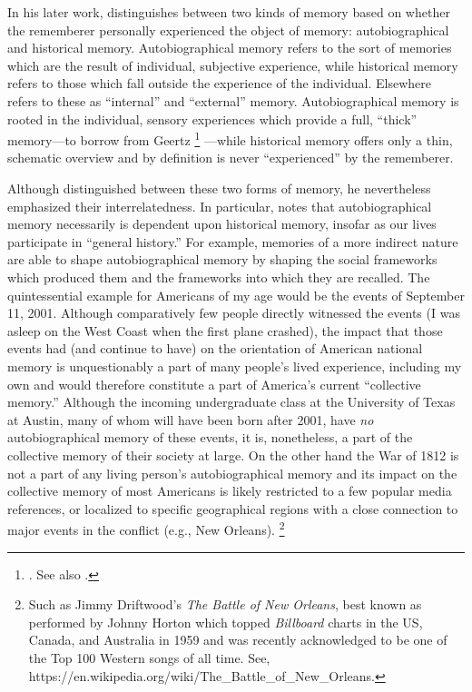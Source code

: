 In his later work, \halbwachs distinguishes between two kinds of memory based on whether the rememberer personally experienced the object of memory: autobiographical and historical memory.%
    \autocite[52]{halbwachs1980}
Autobiographical memory refers to the sort of memories which are the result of individual, subjective experience, while historical memory refers to those which fall outside the experience of the individual. Elsewhere \halbwachs refers to these as ``internal'' and ``external'' memory. Autobiographical memory is rooted in the individual, sensory experiences which provide a full, ``thick'' memory---to borrow from Geertz%
    \footnote{%
        \Cite[3--30]{geertz1973}. See also 
        \cite[189--192]{smith-riley2009}.}%
---while historical memory offers only a thin, schematic overview and by definition is never ``experienced'' by the rememberer.  

Although \halbwachs distinguished between these two forms of memory, he nevertheless emphasized their interrelatedness. In particular, \halbwachs notes that autobiographical memory necessarily is dependent upon historical memory, insofar as our lives participate in ``general history.''%
    \autocite[52]{halbwachs1980}
For example, memories of a more indirect nature are able to shape autobiographical memory by shaping the social frameworks which produced them and the frameworks into which they are recalled. The quintessential example for Americans of my age would be the events of September 11, 2001. Although comparatively few people directly witnessed the events (I was asleep on the West Coast when the first plane crashed), the impact that those events had (and continue to have) on the orientation of American national memory is unquestionably a part of many people's lived experience, including my own and would therefore constitute a part of America's current ``collective memory.'' Although the incoming undergraduate class at the University of Texas at Austin, many of whom will have been born after 2001, have \emph{no} autobiographical memory of these events, it is, nonetheless, a part of the collective memory of their society at large. On the other hand the War of 1812 is not a part of any living person's autobiographical memory and its impact on the collective memory of most Americans is likely restricted to a few popular media references, or localized to specific geographical regions with a close connection to major events in the conflict (e.g., New Orleans).%
    \footnote{%
        Such as Jimmy Driftwood's \emph{The Battle of New   Orleans}, best known as performed by Johnny Horton which topped   \emph{Billboard} charts in the US, Canada, and Australia in 1959 and   was recently acknowledged to be one of the Top 100 Western songs of   all time. See,   https://en.wikipedia.org/wiki/The\_Battle\_of\_New\_Orleans.}

